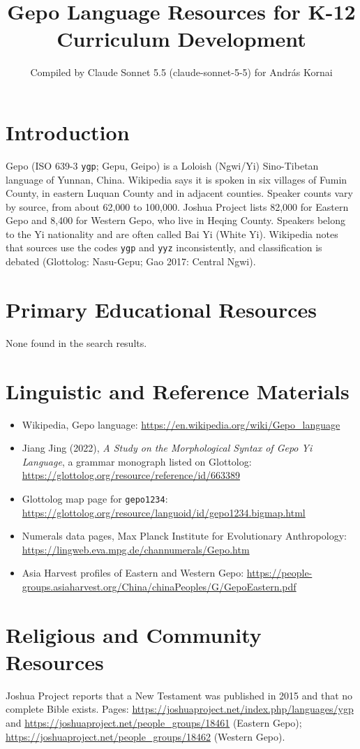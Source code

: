 \documentclass[12pt]{article}
\title{Gepo Language Resources for K-12 Curriculum Development}
\author{Compiled by Claude Sonnet 5.5 (claude-sonnet-5-5) for Andr\'as Kornai}
\date{}
\begin{document}
\maketitle

\section{Introduction}
Gepo (ISO 639-3 \texttt{ygp}; Gepu, Geipo) is a Loloish (Ngwi/Yi) Sino-Tibetan language of Yunnan, China. Wikipedia says it is spoken in six villages of Fumin County, in eastern Luquan County and in adjacent counties. Speaker counts vary by source, from about 62,000 to 100,000. Joshua Project lists 82,000 for Eastern Gepo and 8,400 for Western Gepo, who live in Heqing County. Speakers belong to the Yi nationality and are often called Bai Yi (White Yi). Wikipedia notes that sources use the codes \texttt{ygp} and \texttt{yyz} inconsistently, and classification is debated (Glottolog: Nasu-Gepu; Gao 2017: Central Ngwi).

\section{Primary Educational Resources}
None found in the search results.

\section{Linguistic and Reference Materials}
\begin{itemize}
\item Wikipedia, Gepo language: \url{https://en.wikipedia.org/wiki/Gepo_language}
\item Jiang Jing (2022), \textit{A Study on the Morphological Syntax of Gepo Yi Language}, a grammar monograph listed on Glottolog: \url{https://glottolog.org/resource/reference/id/663389}
\item Glottolog map page for \texttt{gepo1234}: \url{https://glottolog.org/resource/languoid/id/gepo1234.bigmap.html}
\item Numerals data pages, Max Planck Institute for Evolutionary Anthropology: \url{https://lingweb.eva.mpg.de/channumerals/Gepo.htm}
\item Asia Harvest profiles of Eastern and Western Gepo: \url{https://people-groups.asiaharvest.org/China/chinaPeoples/G/GepoEastern.pdf}
\end{itemize}

\section{Religious and Community Resources}
Joshua Project reports that a New Testament was published in 2015 and that no complete Bible exists. Pages: \url{https://joshuaproject.net/index.php/languages/ygp} and \url{https://joshuaproject.net/people_groups/18461} (Eastern Gepo); \url{https://joshuaproject.net/people_groups/18462} (Western Gepo).
\end{document}

